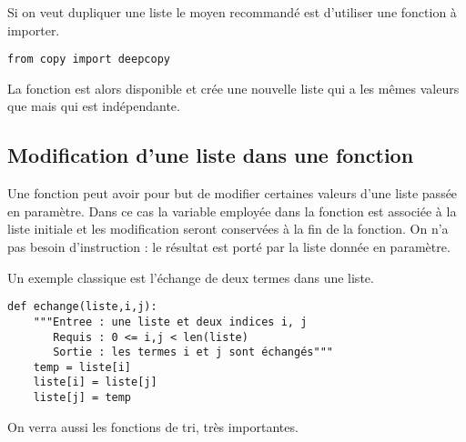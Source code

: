 Si on veut dupliquer une liste le moyen recommandé est d'utiliser une fonction à importer.
\begin{lstlisting}
from copy import deepcopy
\end{lstlisting}
 La fonction  est alors disponible et  crée une nouvelle liste  qui a les mêmes valeurs que  mais qui est indépendante.
\subsection{Modification d'une liste dans une fonction}
Une fonction peut avoir pour but de modifier certaines valeurs d'une liste passée en paramètre. Dans ce cas la variable employée dans la fonction est associée à la liste initiale et les modification seront conservées à la fin de la fonction. On n'a pas besoin d'instruction  : le résultat est porté par la liste donnée en paramètre.

Un exemple classique est l'échange de deux termes dans une liste.
\begin{lstlisting}
def echange(liste,i,j):
    """Entree : une liste et deux indices i, j 
       Requis : 0 <= i,j < len(liste)
       Sortie : les termes i et j sont échangés"""
    temp = liste[i] 
    liste[i] = liste[j]
    liste[j] = temp
\end{lstlisting}

On verra aussi les fonctions de tri, très importantes.
\newpage
